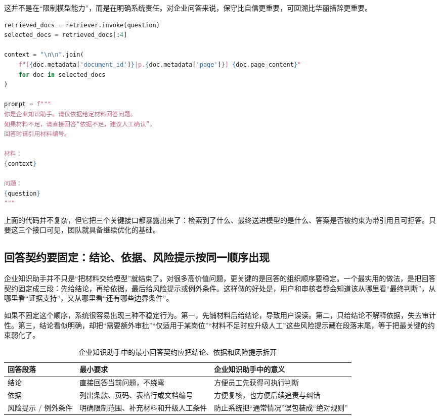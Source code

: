 这并不是在“限制模型能力”，而是在明确系统责任。对企业问答来说，保守比自信更重要，可回溯比华丽措辞更重要。

\begin{lstlisting}[language=Python]
retrieved_docs = retriever.invoke(question)
selected_docs = retrieved_docs[:4]

context = "\n\n".join(
    f"[{doc.metadata['document_id']}|p.{doc.metadata['page']}] {doc.page_content}"
    for doc in selected_docs
)

prompt = f"""
你是企业知识助手。请仅依据给定材料回答问题。
如果材料不足，请直接回答“依据不足，建议人工确认”。
回答时请引用材料编号。

材料：
{context}

问题：
{question}
"""
\end{lstlisting}

上面的代码并不复杂，但它把三个关键接口都暴露出来了：检索到了什么、最终送进模型的是什么、答案是否被约束为带引用且可拒答。只要这三个接口可见，团队就具备继续优化的基础。

\subsection{回答契约要固定：结论、依据、风险提示按同一顺序出现}
企业知识助手并不只是“把材料交给模型”就结束了。对很多高价值问题，更关键的是回答的组织顺序要稳定。一个最实用的做法，是把回答契约固定成三段：先给结论，再给依据，最后给风险提示或例外条件。这样做的好处是，用户和审核者都会知道该从哪里看“最终判断”，从哪里看“证据支持”，又从哪里看“还有哪些边界条件”。

如果不固定这个顺序，系统很容易出现三种不稳定行为。第一，先铺材料后给结论，导致用户误读。第二，只给结论不解释依据，失去审计性。第三，结论看似明确，却把“需要额外审批”“仅适用于某岗位”“材料不足时应升级人工”这些风险提示藏在段落末尾，等于把最关键的约束弱化了。

\begin{table}[H]
\centering
\small
\begin{tabularx}{\textwidth}{>{\raggedright\arraybackslash}p{2.6cm}>{\raggedright\arraybackslash}p{3cm}>{\raggedright\arraybackslash}X}
\toprule
\textbf{回答段落} & \textbf{最小要求} & \textbf{企业知识助手中的意义} \\
\midrule
结论 & 直接回答当前问题，不绕弯 & 方便员工先获得可执行判断 \\
依据 & 列出条款、页码、表格行或文档编号 & 方便复核，也方便后续追责与纠错 \\
风险提示 / 例外条件 & 明确限制范围、补充材料和升级人工条件 & 防止系统把“通常情况”误包装成“绝对规则” \\
\bottomrule
\end{tabularx}
\caption{企业知识助手中的最小回答契约应把结论、依据和风险提示拆开}
\label{tab:rag-answer-contract}
\end{table}

